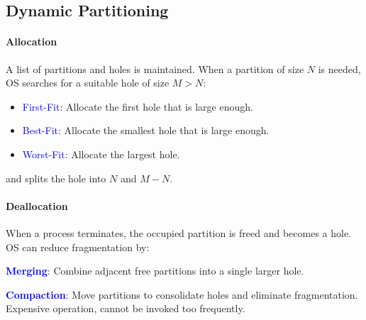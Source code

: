 \vspace{-4mm}
\subsection{Dynamic Partitioning}
\paragraph{Allocation}
A list of partitions and holes is maintained. When a partition of size $N$ is
needed, OS searches for a suitable hole of size $M>N$:
\begin{itemize}
  \item \textcolor{Blue}{First-Fit}: Allocate the first hole that is large enough.
  \item \textcolor{Blue}{Best-Fit}: Allocate the smallest hole that is large enough.
  \item \textcolor{Blue}{Worst-Fit}: Allocate the largest hole.
\end{itemize}
and splits the hole into $N$ and $M-N$.
\paragraph{Deallocation}
When a process terminates, the occupied partition is freed and becomes a hole.
OS can reduce fragmentation by:

\textcolor{Blue}{\textbf{Merging}}: Combine adjacent free partitions into a
single larger hole.

\textcolor{Blue}{\textbf{Compaction}}: Move partitions to consolidate holes and
eliminate fragmentation. \textcolor{Bittersweet}{Expensive operation}, cannot
be invoked too frequently.
